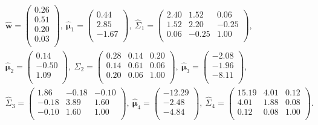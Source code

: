 \documentclass[a4j,12pt]{jarticle}
\begin{document}
\begin{equation}
\label{parameter}
\begin{split}
&\hat {\bm w} = \begin{pmatrix} 0.26 \\ 0.51 \\ 0.20 \\ 0.03 \\ \end{pmatrix},\ 
\hat{\bm \mu}_1 = \begin{pmatrix} 0.44 \\ 2.85 \\ -1.67 \\ \end{pmatrix},\ 
\hat \Sigma_1 = \begin{pmatrix}  2.40 & 1.52 &  0.06 \\ 1.52 & 2.20 & -0.25 \\ 0.06 & -0.25 &1.00 \\ \end{pmatrix},\\ 
&\hat{\bm \mu}_2 = \begin{pmatrix} 0.14 \\ -0.50 \\ 1.09 \\ \end{pmatrix},\ 
\hat \Sigma_2 = \begin{pmatrix}   0.28  & 0.14 &  0.20 \\ 0.14 & 0.61 & 0.06 \\  0.20 & 0.06 &1.00 \\ \end{pmatrix},\ 
\hat{\bm \mu}_3 = \begin{pmatrix} -2.08  \\ -1.96 \\ -8.11 \\ \end{pmatrix},\\ 
&\hat \Sigma_3 = \begin{pmatrix}  1.86  & -0.18 &  -0.10 \\-0.18 & 3.89 & 1.60 \\  -0.10 & 1.60 & 1.00 \\ \end{pmatrix},\ 
\hat{\bm \mu}_4 = \begin{pmatrix} -12.29   \\ -2.48 \\ -4.84 \\ \end{pmatrix},\ 
\hat \Sigma_4 = \begin{pmatrix} 15.19 & 4.01 &  0.12 \\ 4.01 & 1.88 & 0.08 \\ 0.12 & 0.08 &1.00 \\ \end{pmatrix}.
\end{split}
\end{equation}
\end{document}
